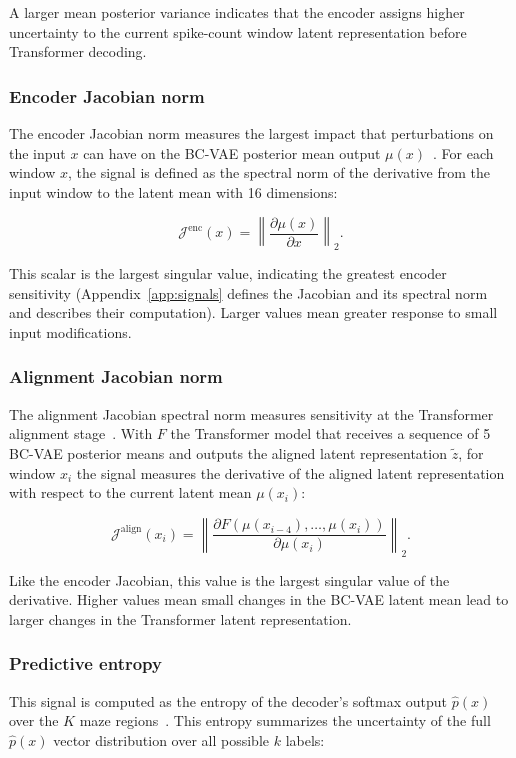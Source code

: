 \documentclass{article}
\begin{document}
A larger mean posterior variance indicates that the encoder assigns higher uncertainty to the current spike-count window latent representation before Transformer decoding.

\subsubsection{Encoder Jacobian norm}
The encoder Jacobian norm measures the largest impact that perturbations on the input $x$ can have on the BC-VAE posterior mean output $\mu(x)$~\cite{barter2019a,miyato2018a}. For each window $x$, the signal is defined as the spectral norm of the derivative from the input window to the latent mean with 16 dimensions:

\begin{equation}
  \mathcal{J}^{\mathrm{enc}}(x)
  =\left\lVert\frac{\partial \mu(x)}{\partial x}\right\rVert_2 .
\end{equation}

This scalar is the largest singular value, indicating the greatest encoder sensitivity (Appendix~\ref{app:signals} defines the Jacobian and its spectral norm and describes their computation). Larger values mean greater response to small input modifications.

\subsubsection{Alignment Jacobian norm}
The alignment Jacobian spectral norm measures sensitivity at the Transformer alignment stage~\cite{barter2019a,miyato2018a}. With $F$ the Transformer model that receives a sequence of 5 BC-VAE posterior means and outputs the aligned latent representation $\tilde z$, for window $x_i$ the signal measures the derivative of the aligned latent representation with respect to the current latent mean $\mu(x_i)$:

\begin{equation}
  \mathcal{J}^{\mathrm{align}}(x_i)
  =\left\lVert
  \frac{\partial F(\mu(x_{i-4}),\ldots,\mu(x_i))}
  {\partial \mu(x_i)}
  \right\rVert_2 .
\end{equation}

Like the encoder Jacobian, this value is the largest singular value of the derivative. Higher values mean small changes in the BC-VAE latent mean lead to larger changes in the Transformer latent representation.

\subsubsection{Predictive entropy}
This signal is computed as the entropy of the decoder's softmax output $\hat p(x)$ over the $K$ maze regions~\cite{lakshminarayanan2017a}. This entropy summarizes the uncertainty of the full $\hat p(x)$ vector distribution over all possible $k$ labels:
\end{document}
